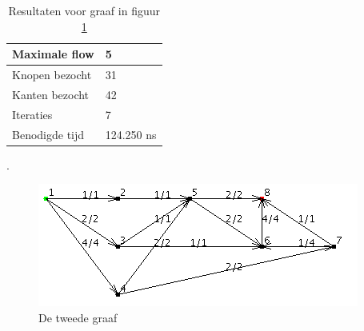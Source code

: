 \begin{table}[h]
 \begin{tabularx}{\linewidth}{| l | X |}
 \hline
 Maximale flow & 5 \\
 \hline
 Knopen bezocht & 31 \\
 \hline
 Kanten bezocht & 42 \\
 \hline
 Iteraties & 7 \\
 \hline
 Benodigde tijd & 124.250 ns \\
 \hline
\end{tabularx}
\centering
\caption{Resultaten voor graaf in figuur \ref{fig:DFSgraph2}}.
\label{tbl:DFSgraph2}
\end{table}

\begin{figure}[h]
	\includegraphics{depthfirst/DFSgraph2}
	\centering
	\caption{De tweede graaf}
	\label{fig:DFSgraph2}
\end{figure}

